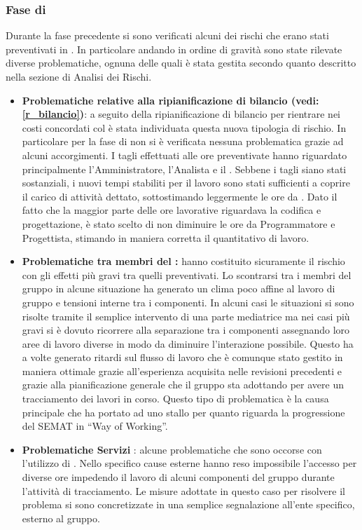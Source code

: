 \subsubsection{Fase di \fVVt}\label{pvv}
Durante la fase precedente si sono verificati alcuni dei rischi che erano stati preventivati in \fCt.
In particolare andando in ordine di gravità sono state rilevate diverse problematiche, ognuna delle quali è stata gestita secondo quanto descritto nella sezione di Analisi dei Rischi.
\begin{itemize}
\item \textbf{Problematiche relative alla ripianificazione di bilancio (vedi: \ref{r_bilancio})}: a seguito della ripianificazione di bilancio per rientrare nei costi concordati col  è stata individuata questa nuova tipologia di rischio.
In particolare per la fase di \fC non si è verificata nessuna problematica grazie ad alcuni accorgimenti.
I tagli effettuati alle ore preventivate hanno riguardato principalmente l'Amministratore, l'Analista e il \rRP.
Sebbene i tagli siano stati sostanziali, i nuovi tempi stabiliti per il lavoro sono stati sufficienti a coprire il carico di attività dettato, sottostimando leggermente le ore da \rRP.
Dato il fatto che la maggior parte delle ore lavorative riguardava la codifica e progettazione, è stato scelto di non diminuire le ore da Programmatore e Progettista, stimando in maniera corretta il quantitativo di lavoro.
\item \textbf{Problematiche tra membri del :} hanno costituito sicuramente il rischio con gli effetti più gravi tra quelli preventivati. Lo scontrarsi tra i membri del gruppo in alcune situazione ha generato un clima poco affine al lavoro di gruppo e tensioni interne tra i componenti. In alcuni casi le situazioni si sono risolte tramite il semplice intervento di una parte mediatrice ma nei casi più gravi si è dovuto ricorrere alla separazione tra i componenti assegnando loro aree di lavoro diverse in modo da diminuire l'interazione possibile. Questo ha a volte generato ritardi sul flusso di lavoro che è comunque stato gestito in maniera ottimale grazie all'esperienza acquisita nelle revisioni precedenti e grazie alla pianificazione generale che il gruppo sta adottando per avere un tracciamento dei lavori in corso.
Questo tipo di problematica è la causa principale che ha portato ad uno stallo per quanto riguarda la progressione del SEMAT in ``Way of Working''.
\item \textbf{Problematiche Servizi }: alcune problematiche che sono occorse con l'utilizzo di \pragmadb. Nello specifico cause esterne hanno reso impossibile l'accesso per diverse ore impedendo il lavoro di alcuni componenti del gruppo durante l'attività di tracciamento. Le misure adottate in questo caso per risolvere il problema si sono concretizzate in una semplice segnalazione all'ente specifico, esterno al gruppo.

\end{itemize}
